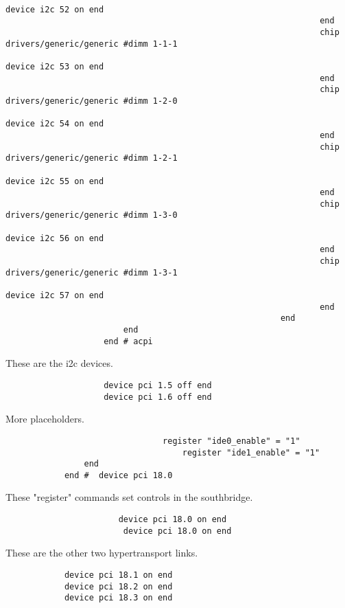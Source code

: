 \documentclass[10pt,letterpaper]{article}
\begin{document}
\begin{verbatim}
                                                                        device i2c 52 on end
                                                                end
                                                                chip drivers/generic/generic #dimm 1-1-1
                                                                        device i2c 53 on end
                                                                end
                                                                chip drivers/generic/generic #dimm 1-2-0
                                                                        device i2c 54 on end
                                                                end
                                                                chip drivers/generic/generic #dimm 1-2-1
                                                                        device i2c 55 on end
                                                                end
                                                                chip drivers/generic/generic #dimm 1-3-0
                                                                        device i2c 56 on end
                                                                end
                                                                chip drivers/generic/generic #dimm 1-3-1
                                                                        device i2c 57 on end
                                                                end
                                                        end
						end
					end # acpi
\end{verbatim}
These are the i2c devices. 
\begin{verbatim}
					device pci 1.5 off end
					device pci 1.6 off end
\end{verbatim}
More placeholders. 
\begin{verbatim}
               	                register "ide0_enable" = "1"
                	                register "ide1_enable" = "1"
				end
			end #  device pci 18.0

\end{verbatim}
These "register" commands set controls in the southbridge. 
\begin{verbatim}
                       device pci 18.0 on end
                        device pci 18.0 on end  
\end{verbatim}
These are the other two hypertransport links. 
\begin{verbatim}
			device pci 18.1 on end
			device pci 18.2 on end
			device pci 18.3 on end
\end{verbatim}
\end{document}
